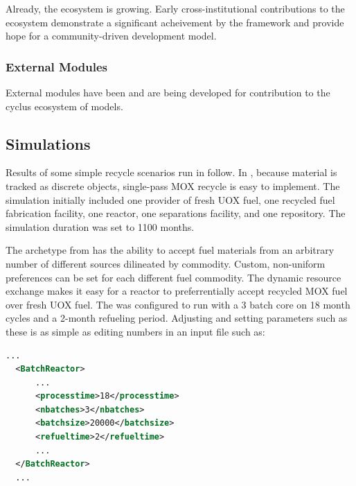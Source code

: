 Already, the ecosystem is growing. Early cross-institutional contributions to 
the ecosystem demonstrate a significant acheivement by the \Cyclus framework 
and provide hope for a community-driven development model. 

\subsubsection{External Modules}
External modules have been 
\cite{cyder,separations,streamblender,mktdriveninst,commodconverter} and are 
being \cite{britelite,utk} developed for contribution to the cyclus ecosystem 
of models. 


\subsection{Simulations}


Results of some simple recycle scenarios run in \Cyclus follow.  In \Cyclus,
because material is tracked as discrete objects, single-pass MOX recycle is
easy to implement.  The simulation initially included one provider of fresh
UOX fuel, one recycled fuel fabrication facility, one reactor, one separations
facility, and one repository. The simulation duration was set to 1100 months.

The  archetype from \Cycamore has the ability to accept
fuel materials from an arbitrary number of different sources dilineated by
commodity. Custom, non-uniform preferences can be set for each different fuel
commodity.  The dynamic resource exchange makes it easy for a reactor to
preferrentially accept recycled MOX fuel over fresh UOX fuel.  The
 was configured to run with a 3 batch core on 18 month cycles and
a 2-month refueling period.  Adjusting and setting parameters such as these is
as simple as editing numbers in an input file such as:

\begin{lstlisting}[language=xml]
  ...
  <BatchReactor>
      ...
      <processtime>18</processtime>
      <nbatches>3</nbatches>
      <batchsize>20000</batchsize>
      <refueltime>2</refueltime>
      ...
  </BatchReactor>
  ...
\end{lstlisting}

